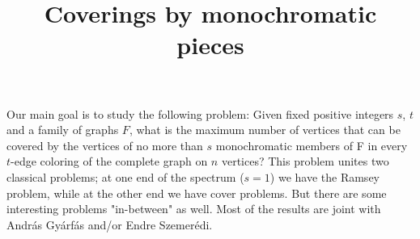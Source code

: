 \title{Coverings by monochromatic pieces}
\endtitle

Our main goal is to study the following problem:
Given fixed positive integers $s$, $t$ and a
family of graphs $F$, what is the maximum number of vertices
that can be covered by the vertices of no more than $s$
monochromatic members of F in every $t$-edge coloring of the complete
graph on $n$ vertices? This problem unites two classical problems;
at one end of the spectrum ($s=1$) we have the Ramsey problem,
while at the other end we have cover problems. But there
are some interesting problems "in-between" as well.
Most of the results are joint with Andr\'as Gy\'arf\'as and/or Endre Szemer\'edi.
